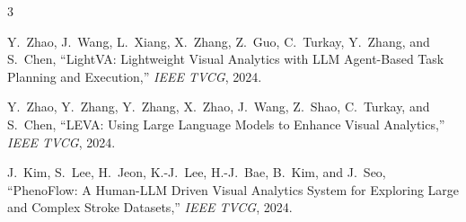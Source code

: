 \documentclass[11pt]{article}
\begin{document}
\begin{thebibliography}{3}

Y.~Zhao, J.~Wang, L.~Xiang, X.~Zhang, Z.~Guo, C.~Turkay, Y.~Zhang, and S.~Chen,
``LightVA: Lightweight Visual Analytics with LLM Agent-Based Task Planning and Execution,''
\textit{IEEE TVCG}, 2024.

Y.~Zhao, Y.~Zhang, Y.~Zhang, X.~Zhao, J.~Wang, Z.~Shao, C.~Turkay, and S.~Chen,
``LEVA: Using Large Language Models to Enhance Visual Analytics,''
\textit{IEEE TVCG}, 2024.

J.~Kim, S.~Lee, H.~Jeon, K.-J.~Lee, H.-J.~Bae, B.~Kim, and J.~Seo,
``PhenoFlow: A Human-LLM Driven Visual Analytics System for Exploring Large and Complex Stroke Datasets,''
\textit{IEEE TVCG}, 2024.

\end{thebibliography}
\end{document}
